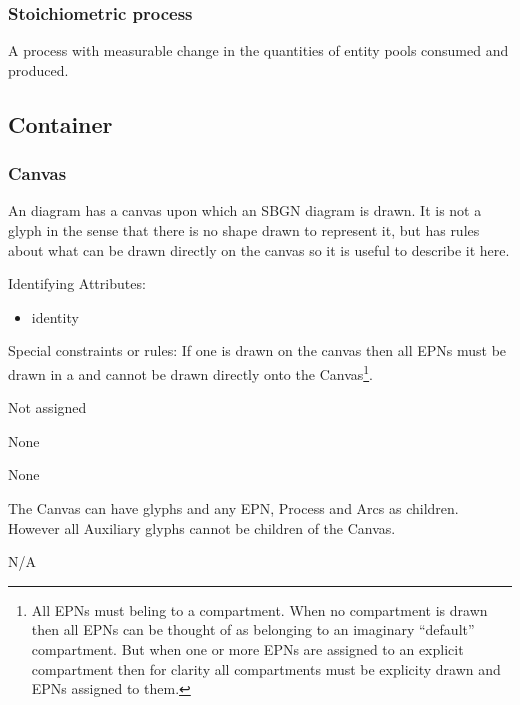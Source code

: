 



\subsubsection{Stoichiometric process}

A process with measurable change in the quantities of entity pools
consumed and produced. 









\subsection{Container}

\subsubsection{Canvas}

An \PD diagram has a canvas upon which an SBGN diagram is drawn. It is
not a glyph in the sense that there is no shape drawn to represent it,
but \SBGNPDLone has rules about what can be drawn directly on the canvas so
it is useful to describe it here.

\begin{glyphDescription}
\item[Identifying Attributes:]\mbox{}
  \begin{itemize}
  \item identity
 \end{itemize}
\item[Special constraints or rules:]\mbox{}\newline If one
   is drawn on the canvas then all EPNs must be
  drawn in a  and cannot be drawn directly onto the
  Canvas\footnote{All EPNs must beling to a compartment. When no compartment is drawn then all EPNs can be
    thought of as belonging to an imaginary ``default''
    compartment. But when one or more EPNs are assigned to an explicit
  compartment then for clarity all compartments must be explicity
  drawn and EPNs assigned to them.}.

\glyphSboTerm Not assigned

\glyphContainer None

\glyphLabel None

\glyphAux The Canvas can have  glyphs and any EPN,
Process and Arcs as children. However all Auxiliary glyphs cannot be
children of the Canvas.
 
\glyphCloning N/A

\end{glyphDescription}


